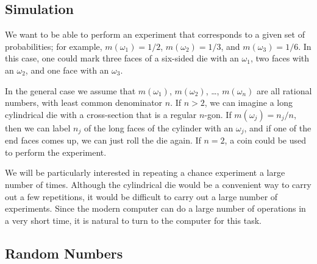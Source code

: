 \subsection*{Simulation}

We want to be able to perform an experiment that corresponds to a given set
of probabilities; for example, $m(\omega_1) = 1/2$, $m(\omega_2) = 1/3$, and
$m(\omega_3) = 1/6$.  In this case, one could mark three faces of a six-sided die with an $\omega_1$,
two faces with an $\omega_2$, and one face with an $\omega_3$.  
\par
In the general case we assume that $m(\omega_1)$, $m(\omega_2)$, \dots, $m(\omega_n)$ are all rational
numbers, with least common denominator $n$.  If $n > 2$, we can imagine a long cylindrical die with a
cross-section that is a regular $n$-gon.  If $m(\omega_j) = n_j/n$, then we can label $n_j$ of the
long faces of the cylinder with an $\omega_j$, and if one of the end faces comes up, we can
just roll the die again.  If $n = 2$, a coin could be used to perform the experiment.
\par
We will be particularly interested in repeating a chance experiment a large
number of times.  Although the cylindrical die would be a convenient way to carry out
a few repetitions, it would be difficult to carry out a large number of
experiments.  Since the modern computer can do a large number of operations
in a very short time, it is natural to turn to the computer for this task.

\subsection*{Random Numbers}

